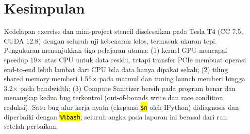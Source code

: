\documentclass[11pt,a4paper]{article}
\newcommand{\cmd}[1]{\hl{\texttt{#1}}}
\begin{document}
\section{Kesimpulan}
Kedelapan exercise dan mini-project stencil diselesaikan pada Tesla T4 (CC 7.5, CUDA 12.8) dengan seluruh uji kebenaran lolos, termasuk ukuran tepi. Pengukuran menunjukkan tiga pelajaran utama: (1) kernel GPU mencapai speedup 19$\times$ atas CPU untuk data residu, tetapi transfer PCIe membuat operasi end-to-end lebih lambat dari CPU bila data hanya dipakai sekali; (2) tiling shared memory memberi 1.55$\times$ pada matmul dan tuning launch memberi hingga 3.2$\times$ pada bandwidth; (3) Compute Sanitizer bersih pada program benar dan menangkap kedua bug terkontrol (out-of-bounds write dan race condition reduksi). Satu bug alur kerja nyata (ekspansi \cmd{\$n} oleh IPython) didiagnosis dan diperbaiki dengan \cmd{\%\%bash}; seluruh angka pada laporan ini berasal dari run setelah perbaikan.
\end{document}
